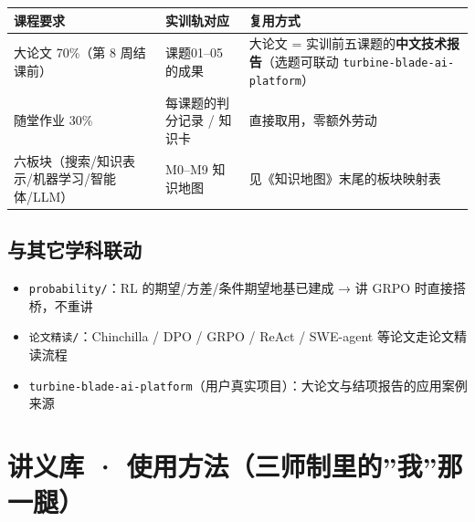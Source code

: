 \documentclass[
  chinese,
  11pt,
]{ctexart}
\newcounter{none} %
\providecommand{\tightlist}{%
  \setlength{\itemsep}{0pt}\setlength{\parskip}{0pt}}
\begin{document}
{\def\LTcaptype{none} %
\begin{longtable}[]{@{}
  >{\raggedright\arraybackslash}p{}
  >{\raggedright\arraybackslash}p{}
  >{\raggedright\arraybackslash}p{}@{}}
\toprule\noalign{}
\begin{minipage}[b]{\linewidth}\raggedright
课程要求
\end{minipage} & \begin{minipage}[b]{\linewidth}\raggedright
实训轨对应
\end{minipage} & \begin{minipage}[b]{\linewidth}\raggedright
复用方式
\end{minipage} \\
\midrule\noalign{}
\endhead
\bottomrule\noalign{}
\endlastfoot
大论文 70\%（第 8 周结课前） & 课题01--05 的成果 & 大论文 = 实训前五课题的\textbf{中文技术报告}（选题可联动 \texttt{turbine-blade-ai-platform}） \\
随堂作业 30\% & 每课题的判分记录 / 知识卡 & 直接取用，零额外劳动 \\
六板块（搜索/知识表示/机器学习/智能体/LLM） & M0--M9 知识地图 & 见《知识地图》末尾的板块映射表 \\
\end{longtable}
}

\subsection{与其它学科联动}\label{ux4e0eux5176ux5b83ux5b66ux79d1ux8054ux52a8}

\begin{itemize}
\tightlist
\item
  \texttt{probability/}：RL 的期望/方差/条件期望地基已建成 → 讲 GRPO 时直接搭桥，不重讲
\item
  \texttt{论文精读/}：Chinchilla / DPO / GRPO / ReAct / SWE-agent 等论文走论文精读流程
\item
  \texttt{turbine-blade-ai-platform}（用户真实项目）：大论文与结项报告的应用案例来源
\end{itemize}

\newpage

\section{讲义库 · 使用方法（三师制里的''我''那一腿）}\label{ux8bb2ux4e49ux5e93-ux4f7fux7528ux65b9ux6cd5ux4e09ux5e08ux5236ux91ccux7684ux6211ux90a3ux4e00ux817f}
\end{document}
